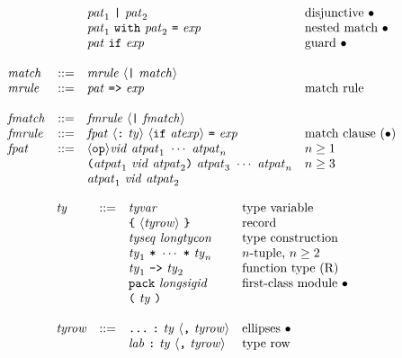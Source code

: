 \documentclass[twoside,titlepage]{article}
\begin{document}
\begin{appendix}
$$\begin{array}{llll}
  && \mathit{pat}_1~\mbox{\tt|}~\mathit{pat}_2 & \textrm{disjunctive $\bullet$} \\
  && \mathit{pat}_1~{\tt{with}}~\mathit{pat}_2~\mbox{\tt=}~\mathit{exp} & \textrm{nested match $\bullet$} \\
  && \mathit{pat}~{\tt{if}}~\mathit{exp} & \textrm{guard $\bullet$} \\
  \\
  \mathit{match} & ::= & \mathit{mrule}~\langle\mbox{\tt|}~\mathit{match}\rangle \\
  \mathit{mrule} & ::= & \mathit{pat}~\mbox{\tt=>}~\mathit{exp} & \textrm{match rule} \\
  \\
  \mathit{fmatch} &::=& \mathit{fmrule}~\langle\mbox{\tt|}~\mathit{fmatch}\rangle \\
  \mathit{fmrule} &::=& \mathit{fpat}~\langle\mbox{\tt:}~\mathit{ty}\rangle~\langle{\tt{if}}~\mathit{atexp}\rangle~\mbox{\tt=}~\mathit{exp} & \textrm{match clause $(\bullet)$} \\
  \mathit{fpat} &::=& \langle{\tt{op}}\rangle\mathit{vid}~\mathit{atpat}_1~\cdots~\mathit{atpat}_n & n\geq1 \\
  && \mbox{\tt(}\mathit{atpat}_1~\mathit{vid}~\mathit{atpat}_2\mbox{\tt)}~\mathit{atpat}_3~\cdots~\mathit{atpat}_n & n\geq3 \\
  && \mathit{atpat}_1~\mathit{vid}~\mathit{atpat}_2
  \end{array}
  $$

  $$
  \begin{array}{llll}
  \mathit{ty} & ::= & \mathit{tyvar} & \textrm{type variable} \\
  && \mbox{\tt\{}~\langle\mathit{tyrow}\rangle~\mbox{\tt\}} & \textrm{record} \\
  && \mathit{tyseq}~\mathit{longtycon} & \textrm{type construction} \\
  && \mathit{ty}_1~\mbox{\tt*}~\cdots~\mbox{\tt*}~\mathit{ty}_n & \textrm{$n$-tuple, $n\geq2$} \\
  && \mathit{ty}_1~\mbox{\tt->}~\mathit{ty}_2 & \textrm{function type (R)} \\
  && {\tt{pack}}~\mathit{longsigid} & \textrm{first-class module $\bullet$} \\
  && \mbox{\tt(}~\mathit{ty}~\mbox{\tt)} \\
  \\
  \mathit{tyrow} & ::= & \mbox{\tt...}~\mbox{\tt:}~\mathit{ty}~\langle\mbox{\tt,}~\mathit{tyrow}\rangle & \textrm{ellipses $\bullet$} \\
  && \mathit{lab}~\mbox{\tt:}~\mathit{ty}~\langle\mbox{\tt,}~\mathit{tyrow}\rangle & \textrm{type row} \\
  \end{array}
  $$


\end{appendix}
\end{document}
